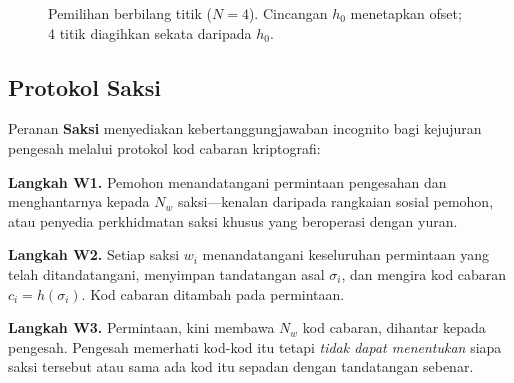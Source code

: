 \documentclass[11pt,a4paper,twocolumn]{article}
\begin{document}
\begin{figure}[ht]
\centering
{}
\caption{Pemilihan berbilang titik ($N{=}4$). Cincangan $h_0$ menetapkan ofset; 4 titik diagihkan sekata daripada $h_0$.}
\label{fig:multipoint}
\end{figure}

\subsection{Protokol Saksi}

Peranan \textbf{Saksi} menyediakan kebertanggungjawaban incognito bagi kejujuran pengesah melalui protokol kod cabaran kriptografi:

\textbf{Langkah W1.} Pemohon menandatangani permintaan pengesahan dan menghantarnya kepada $N_w$ saksi---kenalan daripada rangkaian sosial pemohon, atau penyedia perkhidmatan saksi khusus yang beroperasi dengan yuran.

\textbf{Langkah W2.} Setiap saksi $w_i$ menandatangani keseluruhan permintaan yang telah ditandatangani, menyimpan tandatangan asal $\sigma_i$, dan mengira kod cabaran $c_i = h(\sigma_i)$. Kod cabaran ditambah pada permintaan.

\textbf{Langkah W3.} Permintaan, kini membawa $N_w$ kod cabaran, dihantar kepada pengesah. Pengesah memerhati kod-kod itu tetapi \emph{tidak dapat menentukan} siapa saksi tersebut atau sama ada kod itu sepadan dengan tandatangan sebenar.
\end{document}
